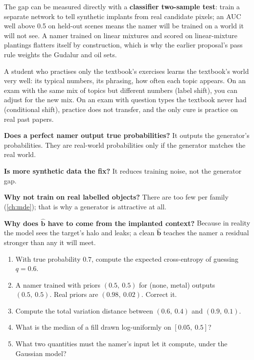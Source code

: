 \documentclass[11pt,a4paper,oneside,openany]{book}
\newcommand{\B}[1]{{\symbf{#1}}}
\newcommand{\B}[1]{{\bm{#1}}}
\newcommand{\vbh}{\hat{\B{b}}}
\begin{document}
The gap can be measured directly with a \textbf{classifier two-sample test}: train a separate network to tell synthetic implants from real candidate pixels; an AUC well above 0.5
on held-out scenes means the namer will be trained on a world it will not see. A namer trained on linear mixtures and scored on linear-mixture plantings flatters itself by
construction, which is why the earlier proposal's pass rule weights the Gudalur and oil sets.

\begin{analogy}
A student who practises only the textbook's exercises learns the textbook's world very well: its typical numbers, its phrasing, how often each topic appears. On an exam
with the same mix of topics but different numbers (label shift), you can adjust for the new mix. On an exam with question types the textbook never had (conditional shift),
practice does not transfer, and the only cure is practice on real past papers.
\end{analogy}

\begin{confusions}
\textbf{Does a perfect namer output true probabilities?} It outputs the generator's probabilities. They are real-world probabilities only if the generator matches the real world.

\textbf{Is more synthetic data the fix?} It reduces training noise, not the generator gap.

\textbf{Why not train on real labelled objects?} There are too few per family (\cref{ch:mde}); that is why a generator is attractive at all.

\textbf{Why does $\vbh$ have to come from the implanted context?} Because in reality the model sees the target's halo and leaks; a clean $\vbh$ teaches the namer a residual
stronger than any it will meet.
\end{confusions}

\begin{checkyourself}
\begin{enumerate}
\item With true probability $0.7$, compute the expected cross-entropy of guessing $q=0.6$.
\item A namer trained with priors $(0.5,\ 0.5)$ for (none, metal) outputs $(0.5,\ 0.5)$. Real priors are $(0.98,\ 0.02)$. Correct it.
\item Compute the total variation distance between $(0.6,\ 0.4)$ and $(0.9,\ 0.1)$.
\item What is the median of a fill drawn log-uniformly on $[0.05,\ 0.5]$?
\item What two quantities must the namer's input let it compute, under the Gaussian model?
\end{enumerate}
\end{checkyourself}
\end{document}
